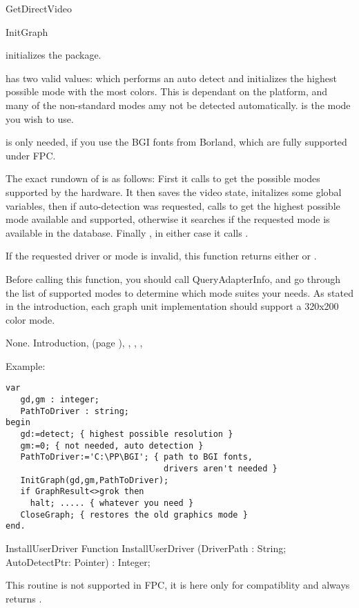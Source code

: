 \begin{function}{GetDirectVideo}
\begin{procedure}{InitGraph}
\Description

 initializes the  package.

 has two valid values:  which
performs an auto detect and initializes the highest possible mode with the most
colors. This is dependant on the platform, and many of the non-standard
modes amy not be detected automatically.  is the mode you
wish to use.

 is only needed, if you use the BGI fonts from
Borland, which are fully supported under FPC.

The exact rundown of  is as follows: First it calls
 to get the possible modes supported by the hardware.
It then saves the video state, initalizes some global variables, then if
auto-detection was requested, calls  to get the highest
possible mode available and supported, otherwise it searches if the requested
mode is available in the database. Finally , in either case it calls
.

If the requested driver or mode is invalid, this function returns either
 or .

Before calling this function, you should call QueryAdapterInfo, and
go through the list of supported modes to determine which mode suites
your needs. As stated in the introduction, each graph unit implementation
should support a 320x200 color mode.

\Errors
None.
\SeeAlso
Introduction, (page \pageref{se:Introduction}),
, , ,
\end{procedure}
Example:
\begin{verbatim}
var
   gd,gm : integer;
   PathToDriver : string;
begin
   gd:=detect; { highest possible resolution }
   gm:=0; { not needed, auto detection }
   PathToDriver:='C:\PP\BGI'; { path to BGI fonts,
                                drivers aren't needed }
   InitGraph(gd,gm,PathToDriver);
   if GraphResult<>grok then
     halt; ..... { whatever you need }
   CloseGraph; { restores the old graphics mode }
end.
\end{verbatim}

\begin{function}{InstallUserDriver}
\Declaration
Function InstallUserDriver (DriverPath : String; AutoDetectPtr: Pointer) : Integer;

\Description
This routine is not supported in FPC, it is here only for compatiblity and
always returns .


\end{function}
\end{function}
